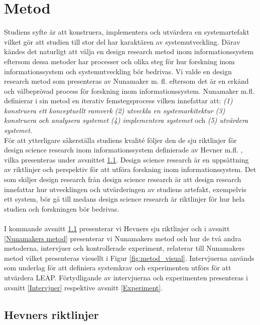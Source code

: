 \documentclass[a4paper,11pt]{article}
\begin{document}
{\newpage
\section{Metod}\label{Metod}

Studiens syfte är att konstruera, implementera och utvärdera en systemartefakt vilket gör att studien till stor del har karaktären av systemutveckling. Därav kändes det naturligt att välja en design research metod inom informationssystem eftersom dessa metoder har processer och olika steg för hur forskning inom informationssystem och systemutveckling bör bedrivas. Vi valde en design research metod som presenteras av Nunamaker m. fl. \cite{nunamaker} eftersom det är en erkänd och välbeprövad process för forskning inom informationssystem. Nunamaker m.fl. definierar i sin metod en iterativ femstegsprocess vilken innefattar att: \textit{(1) konstruera ett konceptuellt ramverk} \textit{(2) utveckla en systemarkitektur} \textit{(3) konstruera och analysera systemet} \textit{(4) implementera systemet} och \textit{(5) utvärdera systemet}.
\\
För att ytterligare säkerställa studiens kvalité följer den de sju riktlinjer för design science research inom informationssystem definierade av Hevner m.fl. \cite{hevner}, vilka presenteras under avsnittet \ref{hevner}. Design science research är en uppsättning av riktlinjer och perspektiv för att utföra forskning inom informationssystem. Det som skiljer design research från design science research är att design research innefattar hur utvecklingen och utvärderingen av studiens artefakt, exempelvis ett system, bör gå till medans design science research är riktlinjer för hur hela studien och forskningen bör bedrivas.
\\
\\
I kommande avsnitt \ref{hevner} presenterar vi Hevners sju riktlinjer och i avsnitt \ref{Nunamakers metod} presenterar vi Nunamakers metod och hur de två andra metoderna, intervjuer och kontrollerade experiment, relaterar till Nunamakers metod vilket presenteras visuellt i Figur \ref{fig:metod_visual}. Intervjuerna används som underlag för att definiera systemkrav och experimenten utförs för att utvärdera LEAP. Förtydligande av intervjuerna och experimenten presenteras i avsnitt \ref{Intervjuer} respektive avsnitt \ref{Experiment}.

\subsection{Hevners riktlinjer} \label{hevner}

}
\end{document}
